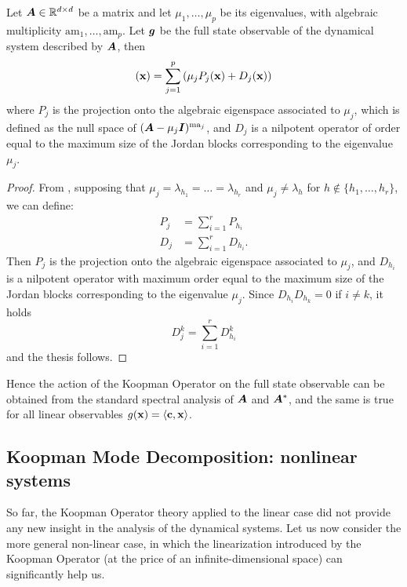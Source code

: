 \begin{corollary}
Let $\vb*{A}\in\mathbb{R}^{d\times d}$ be a matrix and let $\mu_1, \dots, \mu_p$ be its eigenvalues, with algebraic multiplicity $\mathrm{am}_1, \dots, \mathrm{am}_p$. Let $\vb*{g}$ be the full state observable of the dynamical system described by $\vb*{A}$, then
\begin{equation*}
    [\mathcal{K}\vb{g}](\vb{x}) = \sum_{j = 1}^{p} \left(\mu_j P_j(\vb{x}) + D_j(\vb{x}) \right)
\end{equation*}
where $P_j$ is the projection onto the algebraic eigenspace associated to $\mu_j$, which is defined as the null space of $(\vb*{A} - \mu_j\vb*{I})^{\mathrm{ma}_j}$, and $D_j$ is a nilpotent operator of order equal to the maximum size of the Jordan blocks corresponding to the eigenvalue $\mu_j$. 
\end{corollary}
\begin{proof}
From , supposing that $\mu_j = \lambda_{h_1} = \dots = \lambda_{h_r}$ and $\mu_j \neq \lambda_{h}$ for $h\notin\{h_1,\dots, h_r\}$, we can define:
\begin{equation*}
    \begin{split}
        P_j &= \sum_{i=1}^r P_{h_i}\\
        D_j &= \sum_{i=1}^r D_{h_i}.
    \end{split}
\end{equation*}
Then $P_j$ is the projection onto the algebraic eigenspace associated to $\mu_j$, and $D_{h_i}$ is a nilpotent operator with maximum order equal to the maximum size of the Jordan blocks corresponding to the eigenvalue $\mu_j$. Since $D_{h_i}D_{h_k} = 0$ if $i\neq k$, it holds
\begin{equation*}
    D_j^k = \sum_{i=1}^r D_{h_i}^k
\end{equation*}
and the thesis follows.
\end{proof}

Hence the action of the Koopman Operator on the full state observable can be obtained from the standard spectral analysis of $\vb*{A}$ and $\vb*{A}^*$, and the same is true for all linear observables $g(\vb{x}) = \langle \vb{c}, \vb{x} \rangle$.

\subsection{Koopman Mode Decomposition: nonlinear systems}
So far, the Koopman Operator theory applied to the linear case did not provide any new insight in the analysis of the dynamical systems. Let us now consider the more general non-linear case, in which the linearization introduced by the Koopman Operator (at the price of an infinite-dimensional space) can significantly help us.

